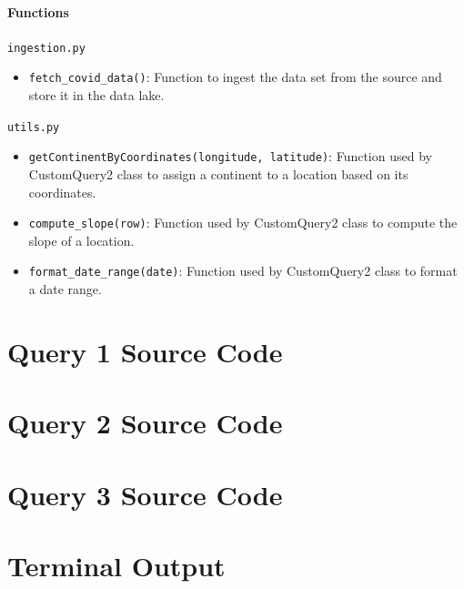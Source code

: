 \documentclass[12pt,oneside]{book} %
\begin{document}
\subsubsection*{Functions}

\begin{description}
    \item \texttt{ingestion.py}
          \begin{itemize}
              \item \texttt{fetch\_covid\_data()}: Function to ingest the data set from the source and store it in the data lake.
          \end{itemize}

    \item \texttt{utils.py}
          \begin{itemize}
              \item \texttt{getContinentByCoordinates(longitude, latitude)}: Function used by CustomQuery2 class to assign a continent to a location based on its coordinates.
              \item \texttt{compute\_slope(row)}: Function used by CustomQuery2 class to compute the slope of a location.
              \item \texttt{format\_date\_range(date)}: Function used by CustomQuery2 class to format a date range.
          \end{itemize}
\end{description}

\chapter{Query 1 Source Code}\label{appendix:1}
\lstset{style=python}


\chapter{Query 2 Source Code}\label{appendix:2}
\lstset{style=python}


\chapter{Query 3 Source Code}\label{appendix:3}
\lstset{style=python}


\chapter{Terminal Output}\label{appendix:4}
\lstset{style=terminal}

\end{document}

